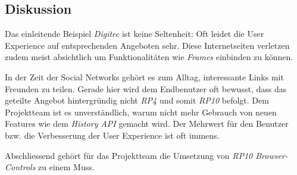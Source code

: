 \subsection*{Diskussion}

Das einleitende Beispiel \emph{Digitec} ist keine Seltenheit: Oft leidet die User Experience auf entsprechenden Angeboten sehr. Diese Internetseiten verletzen zudem meist absichtlich  um Funktionalitäten wie \emph{\gls{Frames}} einbinden zu können.

In der Zeit der Social Networks gehört es zum Alltag, interessante Links mit Freunden zu teilen. Gerade hier wird dem Endbenutzer oft bewusst, dass das geteilte Angebot hintergründig nicht \emph{RP4} und somit \emph{RP10} befolgt. Dem Projektteam ist es unverständlich, warum nicht mehr Gebrauch von neuen Features wie dem \emph{History API} gemacht wird. Der Mehrwert für den Benutzer bzw. die Verbesserung der User Experience ist oft immens.

Abschliessend gehört für das Projektteam die Umsetzung von \emph{RP10 Browser-Controls} zu einem Muss.